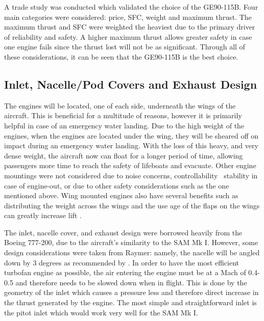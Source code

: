A trade study was conducted which validated the choice of the GE90-115B. Four main categories were considered: price, SFC, weight and maximum thrust. The maximum thrust and SFC were weighted the heaviest due to the primary driver of reliability and safety. A higher maximum thrust allows greater safety in case one engine fails since the thrust lost will not be as significant. Through all of these considerations, it can be seen that the GE90-115B is the best choice.

\subsection{Inlet, Nacelle/Pod Covers and Exhaust Design}

The engines will be located, one of each side, underneath the wings of the aircraft. This is beneficial for a multitude of reasons, however it is primarily helpful in case of an emergency water landing. Due to the high weight of the engines, when the engines are located under the wing, they will be sheared off on impact during an emergency water landing. With the loss of this heavy, and very dense weight, the aircraft now can float for a longer period of time, allowing passengers more time to reach the safety of lifeboats and evacuate. Other engine mountings were not considered due to noise concerns, controllability \ stability in case of engine-out, or due to other safety considerations such as the one mentioned above. Wing mounted engines also have several benefits such as distributing the weight across the wings and the use age of the flaps on the wings can greatly increase lift \cite{raymer}.


The inlet, nacelle cover, and exhaust design were borrowed heavily from the Boeing 777-200, due to the aircraft's similarity to the SAM Mk I. However, some design considerations were taken from Raymer: namely, the nacelle will be angled down by 3 degrees as recommended by \cite{raymer}. In order to have the most efficient turbofan engine as possible, the air entering the engine must be at a Mach of 0.4-0.5 and therefore needs to be slowed down when in flight. This is done by the geometry of the inlet which causes a pressure less and therefore direct increase in the thrust generated by the engine.  The most simple and straightforward inlet is the pitot inlet which would work very well for the SAM Mk I.


